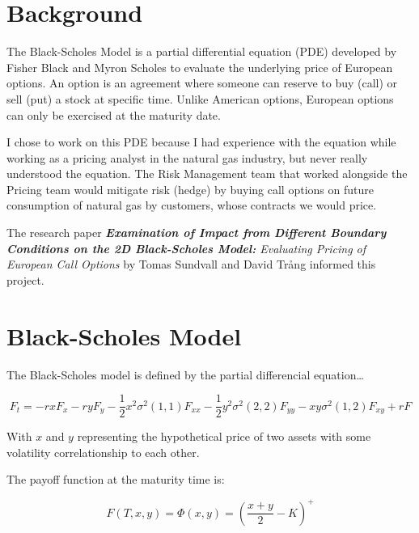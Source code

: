 \documentclass[12pt,letterpaper]{article}
\begin{document}
\section*{Background}
The Black-Scholes Model is a partial differential equation (PDE) developed by Fisher Black and Myron Scholes to evaluate the underlying price of European options. 
An option is an agreement where someone can reserve to buy (call) or sell (put) a stock at specific time. 
Unlike American options, European options can only be exercised at the maturity date.
\vspace*{0.10in}

I chose to work on this PDE because I had experience with the equation while working as a pricing analyst in the natural gas industry, but never really understood the equation.
The Risk Management team that worked alongside the Pricing team would mitigate risk (hedge) by buying call options on future consumption of natural gas by customers, whose contracts we would price.
\vspace*{0.10in}

The research paper \textit{\textbf{Examination of Impact from Different Boundary Conditions on the 2D Black-Scholes Model:} Evaluating Pricing of European Call Options} by Tomas Sundvall and David Trång\cite{sundvall-trang-2014} informed this project.

\vspace*{0.10in}

\section*{Black-Scholes Model}
The Black-Scholes model is defined by the partial differencial equation\ldots

\begin{equation*}
    F_{t} = -rxF_{x}-ryF_{y}-\frac{1}{2}x^{2}\sigma^{2}(1,1)F_{xx} -\frac{1}{2}y^{2}\sigma^{2}(2,2)F_{yy}-xy\sigma^{2}(1,2)F_{xy}+rF
\end{equation*}

With $x$ and $y$ representing the hypothetical price of two assets with some volatility correlationship to each other.

The payoff function at the maturity time is:

\begin{equation*}
    F(T,x,y) = \Phi(x,y) = \left(\frac{x+y}{2}-K\right)^{+}
\end{equation*}
\end{document}
